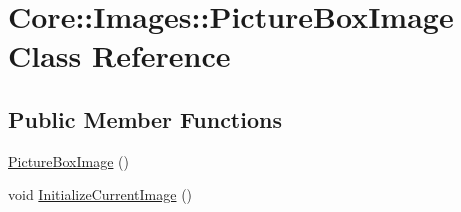 \hypertarget{class_core_1_1_images_1_1_picture_box_image}{
\section{Core::Images::PictureBoxImage Class Reference}
\label{class_core_1_1_images_1_1_picture_box_image}
}
\subsection*{Public Member Functions}
\begin{DoxyCompactItemize}
\item 
\hyperlink{class_core_1_1_images_1_1_picture_box_image_a3b7513c9b52aaaecbd5696bb3ea7fa69}{PictureBoxImage} ()
\item 
void \hyperlink{class_core_1_1_images_1_1_picture_box_image_a45f1dfefcd6edffac692a1e0b15a2a8e}{InitializeCurrentImage} ()
\end{DoxyCompactItemize}
